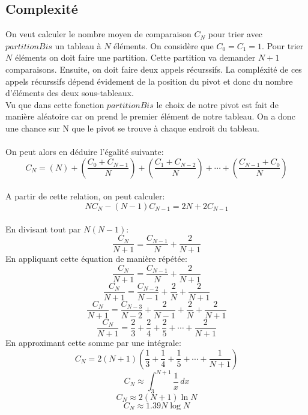 \documentclass[a4paper]{article}
\begin{document}
\subsection{Complexité}
On veut calculer le nombre moyen de comparaison $C_{N}$ pour trier avec $partitionBis$ un tableau à $N$ éléments.
On considère que $C_{0} = C_{1} = 1$.
Pour trier $N$ éléments on doit faire une partition. Cette partition va demander $N+1$ comparaisons.
Ensuite, on doit faire deux appels récurssifs. La compléxité de ces appels récurssifs dépend évidement de la position du pivot et donc du nombre d'éléments des deux sous-tableaux.\\
Vu que dans cette fonction $partitionBis$ le choix de notre pivot est fait de manière aléatoire car on prend le premier élément de notre tableau. On a donc une chance sur N que le pivot se trouve à chaque endroit du tableau.\\
\vspace*{1 mm}\\
On peut alors en déduire l'égalité suivante: \\
\begin{equation}
    C_{N} = (N) + \left( \frac{C_{0} + C_{N-1}}{N} \right) + \left( \frac{C_{1} + C_{N-2}}{N} \right) + \cdots + \left( \frac{C_{N-1} + C_{0}}{N} \right)
\end{equation}\\
A partir de cette relation, on peut calculer:
\begin{equation}
    NC_{N} - (N-1)C_{N-1} = 2N + 2C_{N-1}
\end{equation}\\
En divisant tout par $N(N-1)$:
\begin{equation}
    \frac{C_{N}}{N+1} = \frac{C_{N-1}}{N} + \frac{2}{N+1}
\end{equation}
En appliquant cette équation de manière répétée:
\begin{equation}
    \frac{C_{N}}{N+1} = \frac{C_{N-1}}{N} + \frac{2}{N+1}
\end{equation}
\begin{equation}
    \frac{C_{N}}{N+1} = \frac{C_{N-2}}{N-1} + \frac{2}{N} + \frac{2}{N+1}
\end{equation}
\begin{equation}
    \frac{C_{N}}{N+1} = \frac{C_{N-3}}{N-2} + \frac{2}{N-1} + \frac{2}{N} + \frac{2}{N+1}
\end{equation}
\begin{equation}
    \frac{C_{N}}{N+1} = \frac{2}{3} + \frac{2}{4} + \frac{2}{5} + \cdots + \frac{2}{N+1}
\end{equation}
En approximant cette somme par une intégrale:
\begin{equation}
    C_{N} = 2(N+1)(\frac{1}{3} + \frac{1}{4} + \frac{1}{5} + \cdots + \frac{1}{N+1})
\end{equation}
\begin{equation}
    C_{N} \approx \int_{3}^{N+1} \frac{1}{x} \,dx
\end{equation}
\begin{equation}
    C_{N} \approx 2(N+1)\ln N
\end{equation}
\begin{equation}
    C_{N} \approx 1.39N\log N
\end{equation}
\end{document}
